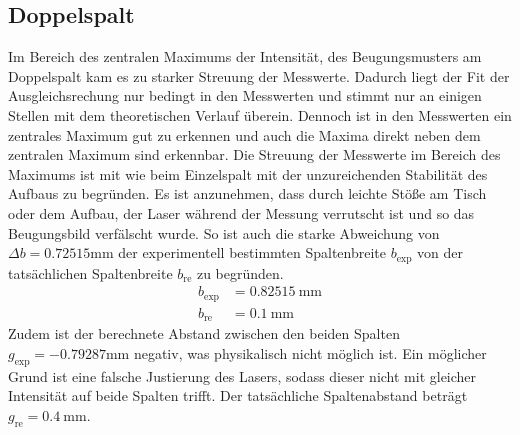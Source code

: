 \subsection{Doppelspalt}
Im Bereich des zentralen Maximums der Intensität, des Beugungsmusters am Doppelspalt kam es zu starker Streuung der Messwerte.
Dadurch liegt der Fit der Ausgleichsrechung nur bedingt in den Messwerten und stimmt nur an einigen Stellen mit dem theoretischen Verlauf überein.
Dennoch ist in den Messwerten ein zentrales Maximum gut zu erkennen und auch die Maxima direkt neben dem zentralen Maximum sind erkennbar.
Die Streuung der Messwerte im Bereich des Maximums ist mit wie beim Einzelspalt mit der unzureichenden Stabilität des Aufbaus zu begründen.
Es ist anzunehmen, dass durch leichte Stöße am Tisch oder dem Aufbau, der Laser während der Messung verrutscht ist und so das Beugungsbild verfälscht wurde.
So ist auch die starke Abweichung von $\Delta b = 0.72515\si{\milli\meter}$ der experimentell bestimmten Spaltenbreite $b_\text{exp}$ von der tatsächlichen Spaltenbreite $b_\text{re}$ zu begründen.
\begin{align*}
b_\text{exp} &= \SI{0.82515}{\milli\meter}\\
b_\text{re} &= \SI{0.1}{\milli\meter}
\end{align*}
Zudem ist der berechnete Abstand zwischen den beiden Spalten $g_\text{exp} = -0.79287\si{\milli\meter}$ negativ, was physikalisch nicht möglich ist.
Ein möglicher Grund ist eine falsche Justierung des Lasers, sodass dieser nicht mit gleicher Intensität auf beide Spalten trifft.
Der tatsächliche Spaltenabstand beträgt $g_\text{re} = \SI{0.4}{\milli\meter}$.
